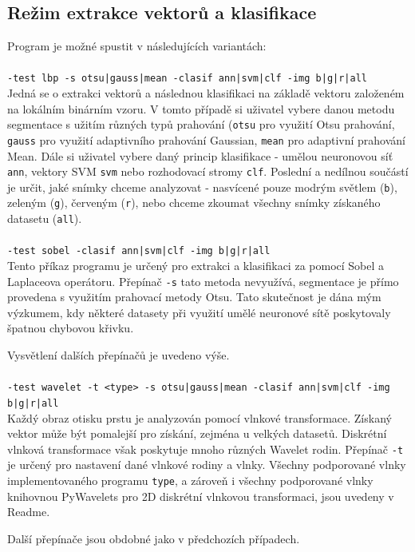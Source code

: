 \subsection{Režim extrakce vektorů a klasifikace}
Program je možné spustit v následujících variantách:\\\\
\verb=-test lbp -s otsu|gauss|mean -clasif ann|svm|clf -img b|g|r|all=\\
Jedná se o extrakci vektorů a následnou klasifikaci na základě vektoru založeném na lokálním binárním vzoru. V tomto případě si uživatel vybere danou metodu segmentace s užitím různých typů prahování (\verb=otsu= pro využití Otsu prahování, \verb=gauss= pro využití adaptivního prahování Gaussian, \verb=mean= pro adaptivní prahování Mean. Dále si uživatel vybere daný princip klasifikace - umělou neuronovou síť \verb=ann=, vektory SVM \verb=svm= nebo rozhodovací stromy \verb=clf=. Poslední a nedílnou součástí je určit, jaké snímky chceme analyzovat - nasvícené pouze modrým světlem (\verb=b=), zeleným (\verb=g=), červeným (\verb=r=), nebo chceme zkoumat všechny snímky získaného datasetu (\verb=all=).\\\\
\verb=-test sobel -clasif ann|svm|clf -img b|g|r|all=\\
Tento příkaz programu je určený pro extrakci a klasifikaci za pomocí Sobel a Laplaceova operátoru. Přepínač \verb=-s= tato metoda nevyužívá, segmentace je přímo provedena s využitím prahovací metody Otsu. Tato skutečnost je dána mým výzkumem, kdy některé datasety při využití umělé neuronové sítě poskytovaly špatnou chybovou křivku.

Vysvětlení dalších přepínačů je uvedeno výše.\\\\
\verb=-test wavelet -t <type> -s otsu|gauss|mean -clasif ann|svm|clf -img b|g|r|all=\\
Každý obraz otisku prstu je analyzován pomocí vlnkové transformace. Získaný vektor může být pomalejší pro získání, zejména u velkých datasetů. Diskrétní vlnková transformace však poskytuje mnoho různých Wavelet rodin. Přepínač \verb=-t= je určený pro nastavení dané vlnkové rodiny a vlnky. Všechny podporované vlnky implementovaného programu \verb=type=, a zároveň i všechny podporované vlnky knihovnou PyWavelets pro 2D diskrétní vlnkovou transformaci, jsou uvedeny v Readme. 

Další přepínače jsou obdobné jako v předchozích případech.

